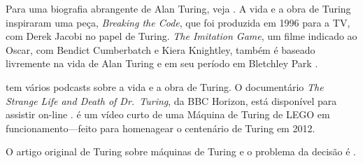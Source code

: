 \documentclass[../../../include/open-logic-section]{subfiles}
\begin{document}
\begin{reading}
Para uma biografia abrangente de Alan Turing, veja \citet{Hodges2014}.
A vida e a obra de Turing inspiraram uma peça, \emph{Breaking the Code},
que foi produzida em 1996 para a TV, com Derek Jacobi no papel de
Turing. \emph{The Imitation Game}, um filme indicado ao Oscar,
com Bendict Cumberbatch e Kiera Knightley, também é baseado livremente
na vida de Alan Turing e em seu período em Bletchley Park
\citep{Imitation2014}.

\citet{Radiolab2012} tem vários podcasts sobre a vida e a obra de Turing.
O documentário \emph{The Strange Life and Death of Dr.~Turing}, da BBC
Horizon, está disponível para assistir on-line \citep{Sykes1992}.
\citep{Theelen2012} é um vídeo curto de uma Máquina de Turing de LEGO em
funcionamento---feito para homenagear o centenário de Turing em 2012.

O artigo original de Turing sobre máquinas de Turing e o problema da decisão é
\citet{Turing1937}.
\end{reading}
\end{document}
